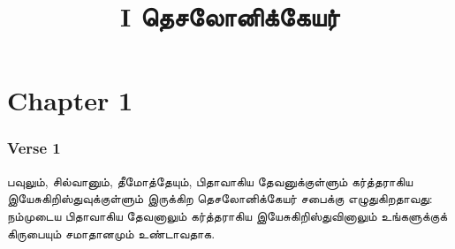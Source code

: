 \documentclass{beamer}
\title{I தெசலோனிக்கேயர்}
\begin{document}
\maketitle

\section{Chapter 1}

\begin{frame}
\frametitle{Verse 1}
பவுலும், சில்வானும், தீமோத்தேயும், பிதாவாகிய தேவனுக்குள்ளும் கர்த்தராகிய இயேசுகிறிஸ்துவுக்குள்ளும் இருக்கிற தெசலோனிக்கேயர் சபைக்கு எழுதுகிறதாவது: நம்முடைய பிதாவாகிய தேவனாலும் கர்த்தராகிய இயேசுகிறிஸ்துவினாலும் உங்களுக்குக் கிருபையும் சமாதானமும் உண்டாவதாக.
\end{frame}
\end{document}
